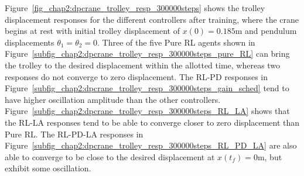 Figure~\ref{fig_chap2:dpcrane_trolley_resp_300000steps} shows the trolley displacement responses for the different controllers after training, where the crane begins at rest with initial trolley displacement of $x(0)=0.185\si{\meter}$ and pendulum displacements $\theta_1=\theta_2=0$.
Three of the five Pure RL agents shown in Figure~\ref{subfig_chap2:dpcrane_trolley_resp_300000steps_pure_RL} can bring the trolley to the desired displacement within the allotted time, whereas two responses do not converge to zero displacement. The RL-PD responses in Figure~\ref{subfig_chap2:dpcrane_trolley_resp_300000steps_gain_sched} tend to have higher oscillation amplitude than the other controllers. Figure~\ref{subfig_chap2:dpcrane_trolley_resp_300000steps_RL_LA} shows that the RL-LA responses tend to be able to converge closer to zero displacement than Pure RL. The RL-PD-LA responses in Figure~\ref{subfig_chap2:dpcrane_trolley_resp_300000steps_RL_PD_LA} are also able to converge to be close to the desired displacement at $x(t_f)=0\si{\meter}$, but exhibit some oscillation.
%
